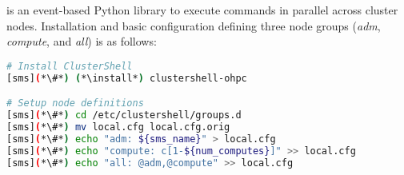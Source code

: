 \clustershell{} is an event-based Python library to execute commands in parallel
across cluster nodes. Installation and basic configuration defining three node
groups ({\em adm}, {\em compute}, and {\em all}) is as follows:

\begin{lstlisting}[language=bash,keywords={},upquote=true]
# Install ClusterShell
[sms](*\#*) (*\install*) clustershell-ohpc

# Setup node definitions
[sms](*\#*) cd /etc/clustershell/groups.d
[sms](*\#*) mv local.cfg local.cfg.orig
[sms](*\#*) echo "adm: ${sms_name}" > local.cfg
[sms](*\#*) echo "compute: c[1-${num_computes}]" >> local.cfg
[sms](*\#*) echo "all: @adm,@compute" >> local.cfg
\end{lstlisting}


